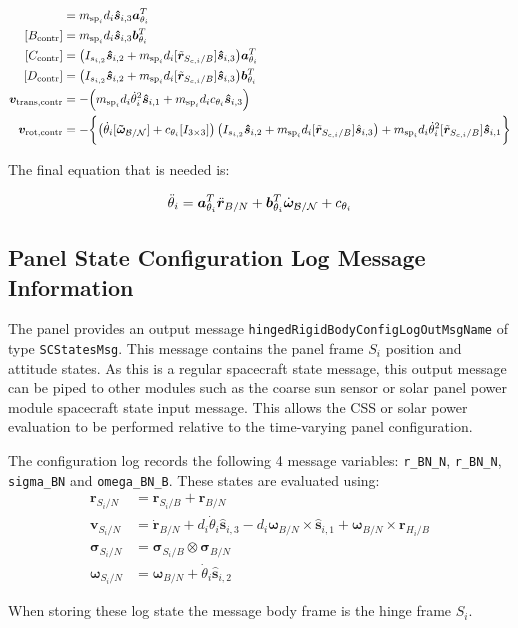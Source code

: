 \begin{align}
[A_{\textnormal{contr}}] &= m_{\text{sp}_i}d_i \bm{\hat{s}}_{i,3} \bm a_{\theta_i}^T
\\
[B_{\textnormal{contr}}] &= m_{\text{sp}_i}d_i \bm{\hat{s}}_{i,3} \bm b_{\theta_i}^T 
\\
[C_{\textnormal{contr}}] &= \big( I_{s_{i,2}}\bm{\hat{s}}_{i,2}+m_{\text{sp}_i}d_i [\tilde{\bm{r}}_{S_{c,i}/B}] \bm{\hat{s}}_{i,3}\big)\bm a_{\theta_i}^T
\\
[D_{\textnormal{contr}}] &= \big( I_{s_{i,2}}\bm{\hat{s}}_{i,2}+m_{\text{sp}_i}d_i [\tilde{\bm{r}}_{S_{c,i}/B}] \bm{\hat{s}}_{i,3}\big) \bm b_{\theta_i}^T
\\
\bm v_{\text{trans,contr}} &= -\Big(m_{\text{sp}_i}d_i \dot{\theta}_i^2 \bm{\hat{s}}_{i,1}+m_{\text{sp}_i}d_i c_{\theta_i} \bm{\hat{s}}_{i,3} \Big)
\\
\bm v_{\text{rot,contr}} &= -\biggl\lbrace\big(\dot{\theta}_i [\bm{\tilde{\omega}}_{\cal B/N}] +c_{\theta_i} [I_{3\times3}]\big) \left(I_{s_{i,2}} \bm{\hat{s}}_{i,2}+m_{\text{sp}_i} d_i [\tilde{\bm{r}}_{S_{c,i}/B}] \hat{\bm s}_{i,3}\right) +m_{\text{sp}_i}d_i\dot{\theta}_i^2[\tilde{\bm{r}}_{S_{c,i}/B}] \bm{\hat{s}}_{i,1} \biggr\rbrace 
\end{align}

The final equation that is needed is:

\begin{equation}
\ddot \theta_i = \bm a_{\theta_i}^T \ddot{\bm r}_{B/N} + \bm b_{\theta_i}^T \dot{\bm\omega}_{\cal B/N} + c_{\theta_i}
\label{eq:solar_panel_final5}
\end{equation}



\subsection{Panel State Configuration Log Message Information}
The panel provides an output message {\tt hingedRigidBodyConfigLogOutMsgName} of type {\tt SCStatesMsg}.  This message contains the panel frame $S_i$ position and attitude states.  As this is a regular spacecraft state message, this output message can be piped to other modules such as the coarse sun sensor or solar panel power module spacecraft state input message.  This allows the CSS or solar power evaluation to be performed relative to the time-varying panel configuration.

The configuration log records the following 4 message variables: {\tt r\_BN\_N}, {\tt r\_BN\_N}, {\tt sigma\_BN} and {\tt omega\_BN\_B}.  These states are evaluated using:
\begin{align}
	\bm r_{S_i/N} &= \bm r_{S_i/B} + \bm r_{B/N}
	\\
	\bm v_{S_i/N} &= \dot{\bm r}_{B/N} + d_i \dot\theta_i \hat{\bm s}_{i,3} - d_i \bm\omega_{B/N}\times \hat{\bm s}_{i,1} + \bm\omega_{B/N} \times \bm r_{H_i/B}
	\\
	\bm\sigma_{S_i/N} &=  \bm\sigma_{S_i/B} \otimes\bm\sigma_{B/N}
	\\
	\bm\omega_{S_i/N} &= \bm\omega_{B/N} + \dot\theta_i \hat{\bm s}_{i,2}
\end{align}

When storing these log state the message body frame is the hinge frame $S_i$.
